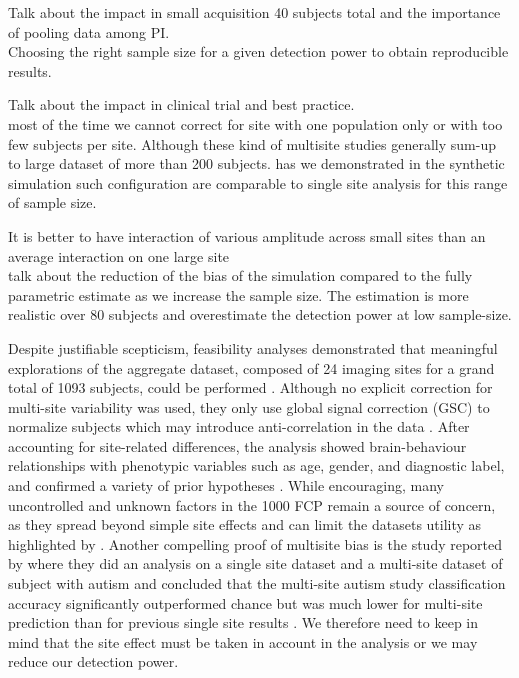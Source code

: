 \documentclass[authoryear]{elsarticle}
\begin{document}
Talk about the impact in small acquisition 40 subjects total and the importance of pooling data among PI.\\
Choosing the right sample size for a given detection power to obtain reproducible results.

Talk about the impact in clinical trial and best practice.\\
	most of the time we cannot correct for site with one population only or with too few subjects per site. Although these kind of multisite studies generally sum-up to large dataset of more than 200 subjects. has we demonstrated in the synthetic simulation such configuration are comparable to single site analysis for this range of sample size.

It is better to have interaction of various amplitude across small sites than an average interaction on one large site\\

talk about the reduction of the bias of the simulation compared to the fully parametric estimate as we increase the sample size. The estimation is more realistic over 80 subjects and overestimate the detection power at low sample-size.

Despite justifiable scepticism, feasibility analyses demonstrated that meaningful explorations of the aggregate dataset, composed of 24 imaging sites for a grand total of 1093 subjects, could be performed \citep{Biswal2010}. Although no explicit correction for multi-site variability was used, they only use global signal correction (GSC) to normalize subjects which may introduce anti-correlation in the data \citep{Fox2009, Murphy2009, Saad2012, Carbonell2014, Power2014}. After accounting for site-related differences, the analysis showed brain-behaviour relationships with phenotypic variables such as age, gender, and diagnostic label, and confirmed a variety of prior hypotheses \citep{Biswal2010, Fair2012, Tomasi2010, Zuo2012}. While encouraging, many uncontrolled and unknown factors in the 1000 FCP remain a source of concern, as they spread beyond simple site effects and can limit the datasets utility as highlighted by \cite{Yan2013}. Another compelling proof of multisite bias is the study reported by \cite{Nielsen2013} where they did an analysis on a single site dataset and a multi-site dataset of subject with autism and concluded that the multi-site autism study classification accuracy significantly outperformed chance but was much lower for multi-site prediction than for previous single site results \citep{Nielsen2013}. We therefore need to keep in mind that the site effect must be taken in account in the analysis or we may reduce our detection power.
\end{document}
